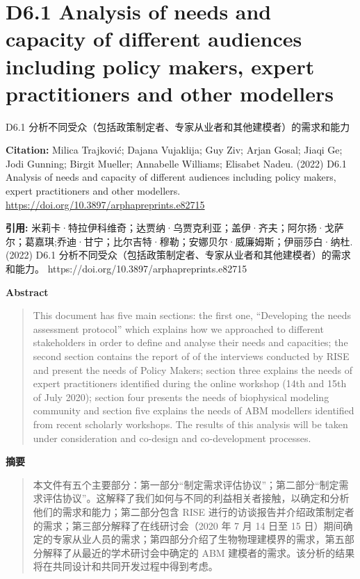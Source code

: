 \vspace{0.5em}
\chapter{D6.1 Analysis of needs and capacity of different audiences including policy makers, expert practitioners and other modellers}
\begin{center}\small D6.1 分析不同受众（包括政策制定者、专家从业者和其他建模者）的需求和能力\end{center}

\noindent\textbf{Citation:} Milica Trajković; Dajana Vujaklija; Guy Ziv; Arjan Gosal; Jiaqi Ge; Jodi Gunning; Birgit Mueller; Annabelle Williams; Elisabet Nadeu. (2022) D6.1 Analysis of needs and capacity of different audiences including policy makers, expert practitioners and other modellers. \url{https://doi.org/10.3897/arphapreprints.e82715}

\vspace{0.5em}
\noindent\textbf{引用:} 米莉卡·特拉伊科维奇；达贾纳·乌贾克利亚；盖伊·齐夫；阿尔扬·戈萨尔；葛嘉琪;乔迪·甘宁；比尔吉特·穆勒；安娜贝尔·威廉姆斯；伊丽莎白·纳​​杜. (2022) D6.1 分析不同受众（包括政策制定者、专家从业者和其他建模者）的需求和能力。 https://doi.org/10.3897/arphapreprints.e82715

\vspace{1.5em}
\noindent\textbf{Abstract}\par
\begin{quote}\small
This document has five main sections: the first one, ``Developing the needs assessment protocol'' which explains how we approached to different stakeholders in order to define and analyse their needs and capacities; the second section contains the report of of the interviews conducted by RISE and present the needs of Policy Makers; section three explains the needs of expert practitioners identified during the online workshop (14th and 15th of July 2020); section four presents the needs of biophysical modeling community and section five explains the needs of ABM modellers identified from recent scholarly workshops. The results of this analysis will be taken under consideration and co-design and co-development processes.
\end{quote}

\noindent\textbf{摘要}\par
\begin{quote}\small
本文件有五个主要部分：第一部分“制定需求评估协议”；第二部分“制定需求评估协议”。这解释了我们如何与不同的利益相关者接触，以确定和分析他们的需求和能力；第二部分包含 RISE 进行的访谈报告并介绍政策制定者的需求；第三部分解释了在线研讨会（2020 年 7 月 14 日至 15 日）期间确定的专家从业人员的需求；第四部分介绍了生物物理建模界的需求，第五部分解释了从最近的学术研讨会中确定的 ABM 建模者的需求。该分析的结果将在共同设计和共同开发过程中得到考虑。
\end{quote}

